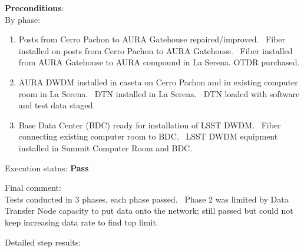 \documentclass[DM,lsstdraft,STR,toc]{lsstdoc}
\providecommand{\tightlist}{
  \setlength{\itemsep}{0pt}\setlength{\parskip}{0pt}}
\begin{document}
    \textbf{ Preconditions}:\\
    By phase:

\begin{enumerate}
\tightlist
\item
  Posts from Cerro Pachon to AURA Gatehouse repaired/improved. ~Fiber
  installed on posts from Cerro Pachon to AURA Gatehouse. ~Fiber
  installed from AURA Gatehouse to AURA compound in La Serena. OTDR
  purchased.
\item
  AURA DWDM installed in caseta on Cerro Pachon and in existing computer
  room in La Serena. ~DTN installed in La Serena. ~DTN loaded with
  software and test data staged.
\item
  Base Data Center (BDC) ready for installation of LSST DWDM. ~Fiber
  connecting existing computer room to BDC. ~LSST DWDM equipment
  installed in Summit Computer Room and BDC.
\end{enumerate}


    Execution status: {\bf Pass }

    Final comment:\\Tests conducted in 3 phases, each phase passed. ~Phase 2 was limited by
Data Transfer Node capacity to put data onto the network; still passed
but could not keep increasing data rate to find top limit.



    Detailed step results:
\end{document}
